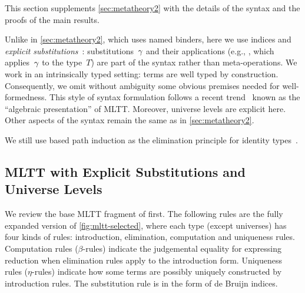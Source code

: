 This section supplements \cref{sec:metatheory2} with the details of the syntax
and the proofs of the main results.

Unlike in \cref{sec:metatheory2}, which uses named binders, here we
use \citeauthor{debruijn1964} indices and \emph{explicit
substitutions}~\cite{abadi1989subst,substcalculus}:
substitutions~$\gamma$ and their applications (e.g., , which
applies~$\gamma$ to the type~$T$) are part of the syntax rather than
meta-operations.
We work in an intrinsically typed setting: terms are well typed by construction.
%
Consequently, we omit without ambiguity some obvious premises needed for well-formedness.
% 
This style of syntax formulation follows a recent
trend~\cite{altkap2016,coquand2018canonicity,gratzer-sterling-birkedal-2019}
known as the ``algebraic presentation'' of MLTT.
Moreover, universe levels are explicit here. Other aspects of the syntax remain the same as in \cref{sec:metatheory2}.

We still use based path induction
as the elimination principle for identity types~\cite{program2013homotopy}.






\subsection{MLTT with Explicit Substitutions and Universe Levels}
\label{sec:mltt-full}

We review the base MLTT fragment of \TT first. The following rules are the fully expanded version of \cref{fig:mltt-selected}, where each type (except universes) has four kinds of rules: introduction, elimination, computation and uniqueness rules. Computation rules ($\beta$-rules) indicate the judgemental equality for expressing reduction when elimination rules apply to the introduction form. Uniqueness rules ($\eta$-rules) indicate how some terms are possibly uniquely constructed by introduction rules. The substitution rule is in the form of de Bruijn indices.

